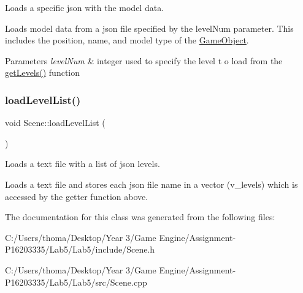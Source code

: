 Loads a specific json with the model data. 

Loads model data from a json file specified by the level\+Num parameter. This includes the position, name, and model type of the \mbox{\hyperlink{class_game_object}{Game\+Object}}. 
\begin{DoxyParams}{Parameters}
{\em level\+Num} & integer used to specify the level t o load from the \mbox{\hyperlink{class_scene_a81ed92e210490ef87f67d793771d267e}{get\+Levels()}} function \\
\hline
\end{DoxyParams}
\mbox{\label{class_scene_a6c6f1a202dcabaa123ec191c206d9e33}} 
\subsubsection{\texorpdfstring{loadLevelList()}{loadLevelList()}}
{\footnotesize\ttfamily void Scene\+::load\+Level\+List (\begin{DoxyParamCaption}{ }\end{DoxyParamCaption})}



Loads a text file with a list of json levels. 

Loads a text file and stores each json file name in a vector (v\+\_\+levels) which is accessed by the getter function above. 

The documentation for this class was generated from the following files\+:\begin{DoxyCompactItemize}
\item 
C\+:/\+Users/thoma/\+Desktop/\+Year 3/\+Game Engine/\+Assignment-\/\+P16203335/\+Lab5/\+Lab5/include/Scene.\+h\item 
C\+:/\+Users/thoma/\+Desktop/\+Year 3/\+Game Engine/\+Assignment-\/\+P16203335/\+Lab5/\+Lab5/src/Scene.\+cpp\end{DoxyCompactItemize}
